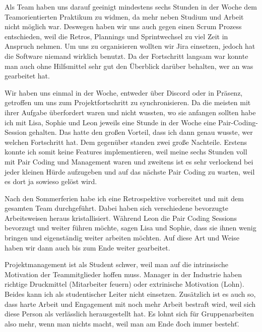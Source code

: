 Als Team haben uns darauf geeinigt mindestens sechs Stunden in der Woche dem Teamorientierten Praktikum zu widmen, da mehr neben Studium und Arbeit nicht möglich war. Deswegen haben wir uns auch gegen einen Scrum Prozess entschieden, weil die Retros, Plannings und Sprintwechsel zu viel Zeit in Anspruch nehmen. Um uns zu organisieren wollten wir Jira einsetzen, jedoch hat die Software niemand wirklich benutzt. Da der Fortschritt langsam war konnte man auch ohne Hilfsmittel sehr gut den Überblick darüber behalten, wer an was gearbeitet hat.

Wir haben uns einmal in der Woche, entweder über Discord oder in Präsenz, getroffen um uns zum Projektfortschritt zu synchronisieren. Da die meisten mit ihrer Aufgabe überfordert waren und nicht wussten, wo sie anfangen sollten habe ich mit Lisa, Sophie und Leon jeweils eine Stunde in der Woche eine Pair-Coding-Session gehalten. Das hatte den großen Vorteil, dass ich dann genau wusste, wer welchen Fortschritt hat. Dem gegenüber standen zwei große Nachteile. Erstens konnte ich somit keine Features implementieren, weil meine sechs Stunden voll mit Pair Coding und Management waren und zweitens ist es sehr verlockend bei jeder kleinen Hürde aufzugeben und auf das nächste Pair Coding zu warten, weil es dort ja sowieso gelöst wird.

Nach den Sommerferien habe ich eine Retrospektive vorbereitet und mit dem gesamten Team durchgeführt. Dabei haben sich verschiedene bevorzugte Arbeitsweisen heraus kristallisiert. Während Leon die Pair Coding Sessions bevorzugt und weiter führen möchte, sagen Lisa und Sophie, dass sie ihnen wenig bringen und eigenständig weiter arbeiten möchten. Auf diese Art und Weise haben wir dann auch bis zum Ende weiter gearbeitet.

Projektmanagement ist als Student schwer, weil man auf die intrinsische Motivation der Teammitglieder hoffen muss. Manager in der Industrie haben richtige Druckmittel (Mitarbeiter feuern) oder extrinische Motivation (Lohn). Beides kann ich als studentischer Leiter nicht einsetzen. Zusätzlich ist es auch so, dass harte Arbeit und Engagement mit noch mehr Arbeit bestraft wird, weil sich diese Person als verlässlich herausgestellt hat. Es lohnt sich für Gruppenarbeiten also mehr, wenn man nichts macht, weil man am Ende \"doch immer besteht\".

